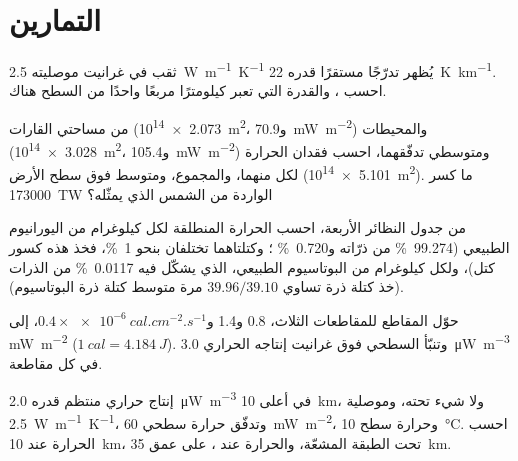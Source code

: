 \section{التمارين}

\begin{exercise}[$\star$]\label{exo:b1:heat-budget:1}
ثقب في غرانيت موصليته \qty{2.5}{W.m^{-1}.K^{-1}} يُظهر تدرّجًا مستقرًا قدره \qty{22}{K.km^{-1}}. احسب ، والقدرة التي تعبر كيلومترًا مربعًا واحدًا من السطح هناك.
\end{exercise}

\begin{exercise}[$\star$]\label{exo:b1:heat-budget:2}
من مساحتي القارات (\qty{2.073e14}{m^2}، و\qty{70.9}{mW.m^{-2}}) والمحيطات (\qty{3.028e14}{m^2}، و\qty{105.4}{mW.m^{-2}}) ومتوسطي تدفّقهما، احسب فقدان الحرارة لكل منهما، والمجموع، ومتوسط  فوق سطح الأرض (\qty{5.101e14}{m^2}). ما كسر \qty{173000}{TW} الواردة من الشمس الذي يمثّله؟
\end{exercise}

\begin{exercise}[$\star$]\label{exo:b1:heat-budget:3}
من جدول النظائر الأربعة، احسب الحرارة المنطلقة لكل كيلوغرام من اليورانيوم الطبيعي (\qty{99.274}{\percent} من ذرّاته  و\qty{0.720}{\percent} ؛ وكتلتاهما تختلفان بنحو \qty{1}{\percent}، فخذ هذه كسور كتل)، ولكل كيلوغرام من البوتاسيوم الطبيعي، الذي يشكّل  فيه \qty{0.0117}{\percent} من الذرات (خذ كتلة ذرة  تساوي $39.96/39.10$ مرة متوسط كتلة ذرة البوتاسيوم).
\end{exercise}

\begin{exercise}[$\star$]\label{exo:b1:heat-budget:4}
حوّل المقاطع للمقاطعات الثلاث، 0.8 و\num{1.4} و$0.4\times\qty{e-6}{cal.cm^{-2}.s^{-1}}$، إلى \unit{mW.m^{-2}} ($\qty{1}{cal} = \qty{4.184}{J}$). وتنبّأ  السطحي فوق غرانيت إنتاجه الحراري \qty{3.0}{\micro W.m^{-3}} في كل مقاطعة.
\end{exercise}

\begin{exercise}[$\star\star$]\label{exo:b1:heat-budget:5}
 إنتاج حراري منتظم قدره \qty{2.0}{\micro W.m^{-3}} في أعلى \qty{10}{km}، ولا شيء تحته، وموصلية \qty{2.5}{W.m^{-1}.K^{-1}}، وتدفّق حرارة سطحي \qty{60}{mW.m^{-2}}، وحرارة سطح \qty{10}{\degreeCelsius}. احسب الحرارة عند \qty{10}{km}،  تحت الطبقة المشعّة، والحرارة عند ، على عمق \qty{35}{km}.
\end{exercise}

